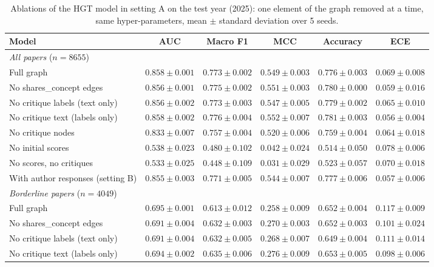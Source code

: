 \begin{table}[t]
\centering
\caption{Ablations of the HGT model in setting A on the test year (2025): one element of the graph removed at a time, same hyper-parameters, mean $\pm$ standard deviation over 5 seeds.}
\label{tab:ablations}
\begin{tabular}{lccccc}
\toprule
Model & AUC & Macro F1 & MCC & Accuracy & ECE \\
\midrule
\multicolumn{6}{l}{\emph{All papers} ($n = 8655$)} \\
Full graph & $0.858 \pm 0.001$ & $0.773 \pm 0.002$ & $0.549 \pm 0.003$ & $0.776 \pm 0.003$ & $0.069 \pm 0.008$ \\
No shares\_concept edges & $0.856 \pm 0.001$ & $0.775 \pm 0.002$ & $0.551 \pm 0.003$ & $0.780 \pm 0.000$ & $0.059 \pm 0.016$ \\
No critique labels (text only) & $0.856 \pm 0.002$ & $0.773 \pm 0.003$ & $0.547 \pm 0.005$ & $0.779 \pm 0.002$ & $0.065 \pm 0.010$ \\
No critique text (labels only) & $0.858 \pm 0.002$ & $0.776 \pm 0.004$ & $0.552 \pm 0.007$ & $0.781 \pm 0.003$ & $0.056 \pm 0.004$ \\
No critique nodes & $0.833 \pm 0.007$ & $0.757 \pm 0.004$ & $0.520 \pm 0.006$ & $0.759 \pm 0.004$ & $0.064 \pm 0.018$ \\
No initial scores & $0.538 \pm 0.023$ & $0.480 \pm 0.102$ & $0.042 \pm 0.024$ & $0.514 \pm 0.050$ & $0.078 \pm 0.006$ \\
No scores, no critiques & $0.533 \pm 0.025$ & $0.448 \pm 0.109$ & $0.031 \pm 0.029$ & $0.523 \pm 0.057$ & $0.070 \pm 0.018$ \\
With author responses (setting B) & $0.855 \pm 0.003$ & $0.771 \pm 0.005$ & $0.544 \pm 0.007$ & $0.777 \pm 0.006$ & $0.057 \pm 0.006$ \\
\midrule
\multicolumn{6}{l}{\emph{Borderline papers} ($n = 4049$)} \\
Full graph & $0.695 \pm 0.001$ & $0.613 \pm 0.012$ & $0.258 \pm 0.009$ & $0.652 \pm 0.004$ & $0.117 \pm 0.009$ \\
No shares\_concept edges & $0.691 \pm 0.004$ & $0.632 \pm 0.003$ & $0.270 \pm 0.003$ & $0.652 \pm 0.003$ & $0.101 \pm 0.024$ \\
No critique labels (text only) & $0.691 \pm 0.004$ & $0.632 \pm 0.005$ & $0.268 \pm 0.007$ & $0.649 \pm 0.004$ & $0.111 \pm 0.014$ \\
No critique text (labels only) & $0.694 \pm 0.002$ & $0.635 \pm 0.006$ & $0.276 \pm 0.009$ & $0.653 \pm 0.005$ & $0.098 \pm 0.006$ \\

\end{tabular}
\end{table}
